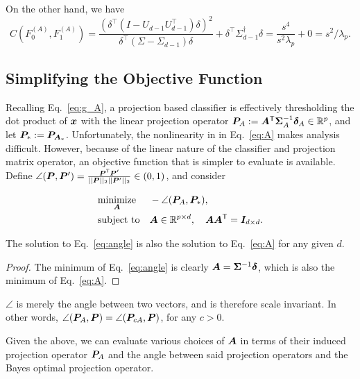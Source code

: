 \documentclass[10pt]{article}
\begin{document}
On the other hand, we have
$$ C(F_0^{(A)}, F_1^{(A)}) = \frac{(\delta^{\top} (I - U_{d-1} U_{d-1}^{\top}) \delta)^{2}}{\delta^{\top} (\Sigma - \Sigma_{d-1}) \delta} + \delta^{\top} \Sigma_{d-1}^{\dagger} \delta = \frac{s^4}{s^2 \lambda_p} + 0 = s^{2}/\lambda_p.$$

\subsection{Simplifying the Objective Function}

Recalling Eq.~\eqref{eq:g_A}, a projection based classifier is effectively thresholding the dot product of $\boldsymbol{x}$ with the linear projection operator $\boldsymbol{P}_A :=\boldsymbol{A}^{\mathsf{T}} \boldsymbol{\Sigma}_A^{-1} \boldsymbol{\delta}_A \in \mathbb{R}^p$, and let $\boldsymbol{P}_*:=\boldsymbol{P}_{\boldsymbol{A}_*}$.  Unfortunately, the nonlinearity in in Eq.~\eqref{eq:A} makes analysis difficult.
However, because of the linear nature of the classifier and projection matrix operator, an objective function that is simpler to evaluate is available.
Define
$\angle(\boldsymbol{P},\boldsymbol{P}') = \frac{ \boldsymbol{P}^{\mathsf{T}} \boldsymbol{P}'}{||\boldsymbol{P}||_2 ||\boldsymbol{P}'||_2} \in (0,1)$, and consider

\begin{equation} \label{eq:angle}
\begin{aligned}
& \underset{\boldsymbol{A}}{\text{minimize}}
& & -\angle(\boldsymbol{P}_A,\boldsymbol{P}_*),
\\ & \text{subject to} & & \boldsymbol{A} \in \mathbb{R}^{p \times d}, \quad \boldsymbol{A} \boldsymbol{A}^{\mathsf{T}} = \boldsymbol{I}_{d \times d}.
\end{aligned}
\end{equation}

\begin{lem} \label{l:angle}
The solution to Eq.~\eqref{eq:angle} is also the solution to Eq.~\eqref{eq:A} for any given $d$.
\end{lem}

\begin{proof}
The minimum of Eq.~\eqref{eq:angle} is clearly $\boldsymbol{A}=\boldsymbol{\Sigma}^{-1} \boldsymbol{\delta}$, which is also the minimum of Eq.~\eqref{eq:A}.
\end{proof}


\begin{remark}
$\angle$ is merely the angle between two vectors, and is therefore scale invariant.  In other words, $\angle(\boldsymbol{P}_A,\boldsymbol{P})=\angle(\boldsymbol{P}_{c A},\boldsymbol{P})$, for any $c > 0$.
\end{remark}

Given the above, we can evaluate various choices of $\boldsymbol{A}$ in terms of their induced projection operator $\boldsymbol{P}_A$ and the angle between said projection operators and the Bayes optimal projection operator.
\end{document}
